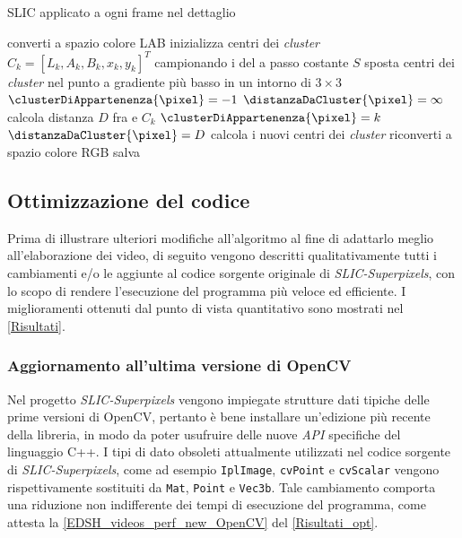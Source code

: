 \documentclass[12pt,a4paper,oneside]{article}
\begin{document}
\begin{algorithm}[!htb]
	\caption{SLIC applicato a ogni frame nel dettaglio}
	\label{Alg_vers_inter}
	\BlankLine
	\BlankLine
	{
	converti \frame a spazio colore \mbox{LAB}\;
	inizializza centri dei \textit{cluster} $C_k = \left[L_k,A_k,B_k,x_k,y_k\right]^T$ campionando i \pixel del \frame a passo costante $S$\;
	sposta centri dei \textit{cluster} nel punto a gradiente più basso in un intorno di $3 \times 3$ \pixel\;
	{
	$\clusterDiAppartenenza{\pixel} = -1$\;
	$\distanzaDaCluster{\pixel} = \infty$\;
	}
	{
	{
	{
	calcola distanza $D$ fra \pixel e $C_k$\;
	{
	$\clusterDiAppartenenza{\pixel} = k$\;
	$\distanzaDaCluster{\pixel} = D$\;
	}
	}
	}
	calcola i nuovi centri dei \textit{cluster}\;
	}
	riconverti \frame a spazio colore \mbox{RGB}\;
	salva \frame\;
	}
\end{algorithm}


\subsection{Ottimizzazione del codice}\label{Ottimizzazione_codice}
Prima di illustrare ulteriori modifiche all'algoritmo al fine di adattarlo meglio all'elaborazione dei video, di seguito vengono descritti qualitativamente tutti i cambiamenti e/o le aggiunte al codice sorgente originale di \textit{SLIC-Superpixels}, con lo scopo di rendere l'esecuzione del programma più veloce ed efficiente. I miglioramenti ottenuti dal punto di vista quantitativo sono mostrati nel \cref{Risultati}.

\subsubsection{Aggiornamento all'ultima versione di \acrshort{OpenCV}}
Nel progetto \textit{SLIC-Superpixels} vengono impiegate strutture dati tipiche delle prime versioni di \gls{OpenCV}, pertanto è bene installare un'edizione più recente della libreria, in modo da poter usufruire delle nuove \textit{\gls{API}} specifiche del linguaggio \mbox{C++}. I tipi di dato obsoleti attualmente utilizzati nel codice sorgente di \textit{SLIC-Superpixels}, come ad esempio \texttt{IplImage}, \texttt{cvPoint} e \texttt{cvScalar} vengono rispettivamente sostituiti da \texttt{Mat}, \texttt{Point} e \texttt{Vec3b}. Tale cambiamento comporta una riduzione non indifferente dei tempi di esecuzione del programma, come attesta la \cref{EDSH_videos_perf_new_OpenCV} del \cref{Risultati_opt}.
\end{document}

